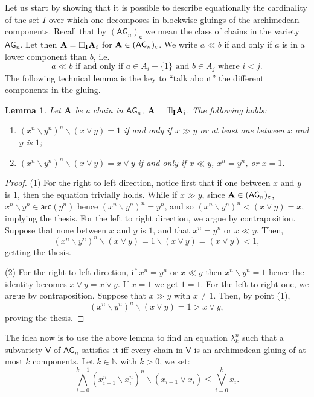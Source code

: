 \documentclass{amsart}
\newtheorem{lemma}[theorem]{Lemma}
\theoremstyle{definition}
\numberwithin{equation}{section}
\newcommand{\join}{\vee}
\newcommand{\alg}[1]{{\textbf{\upshape #1}}}  %
\newcommand{\vv}[1]{\mathsf {#1}}
\newcommand{\arc}[1]{{\vv{arc}}(#1)}
\newcommand{\BG}{\vv{AG}}
\begin{document}
Let us start by showing that it is possible to describe equationally the cardinality of the set $I$ over which one decomposes in blockwise gluings of the archimedean components. Recall that by $(\BG_n)_{\vv c}$ we mean the class of chains in the variety $\BG_{n}$. Let then $\alg A = \boxplus_{\alg I}\alg A_i$ for $\alg A \in (\BG_n)_{\vv c}$. We write $a \ll b$ if and only if $a$ is in a lower component than $b$, i.e. 
$$
a \ll b \mbox{ if and only if } a \in A_i-\{1\} \mbox{ and } b \in A_j \mbox{ where } i <j.
$$
The following technical lemma is the key to ``talk about'' the different components in the gluing.
\begin{lemma} \label{lemma: definition of parts of lamndak}Let $\alg A$ be a chain in $\BG_n$, $\alg A = \boxplus_{\alg I} \alg A_i$. The following holds: 
\begin{enumerate}
	\item $(x^n \backslash y ^n)^n \backslash (x \join y)=1$ if and only if $x \gg y$ or at least one between $x$ and $y$ is $1$; 
	\item $(x^n \backslash y ^n)^n \backslash (x \join y)=x \join y$ if and only if $x \ll y$, $x^n=y^n$, or $x = 1$.
\end{enumerate}	
\end{lemma}
\begin{proof}
	(1) For the right to left direction, notice first that if one between $x$ and $y$ is $1$, then the equation trivially holds. While if $x \gg y$, since $\alg A \in (\BG_{n})_{\vv c}$, $x^n \backslash y^n \in \arc {y^n}$ hence $(x^n \backslash y^n)^n=y^n$, and so $(x^n \backslash y^n)^n < (x \join y)=x$, implying the thesis. For the left to right direction, we argue by contraposition. Suppose that none between $x$ and $y$ is $1$, and that $x^n=y^n$ or $x \ll y$. Then, $$(x^n \backslash y ^n)^n \backslash (x \join y)= 1 \backslash (x \join y)= (x \join y) < 1,$$ getting the thesis. 
	
	
	(2) For the right to left direction, if $x^n=y^n$ or $x \ll y$ then $x^n \backslash y^n=1$ hence the identity becomes $x \lor y = x \lor y$. If $x = 1$ we get $1 = 1$. 
	For the left to right one, we argue by contraposition. Suppose that $x \gg y$ with $x \neq 1$. Then, by point (1), $$(x^n \backslash y ^n)^n \backslash (x \join y)=1 > x \join y,$$ proving the thesis. 
	\end{proof}
The idea now is to use the above lemma to find an equation $\lambda_k^n$ such that a subvariety $\vv V $ of $\BG_{n}$ satisfies it iff every chain in $\vv V$ is an archimedean gluing of at most $k$ components. Let $k \in \mathbb{N}$ with $k > 0$, we set:
\begin{equation*}\tag{$\lambda_k^n$}
		\bigwedge_{i=0}^{k-1} (x_{i+1}^n \backslash x_i^n)^n \backslash (x_{i+1} \vee x_i)\leq \bigvee_{i=0}^{k}x_i.
	\end{equation*}
	
\end{document}
